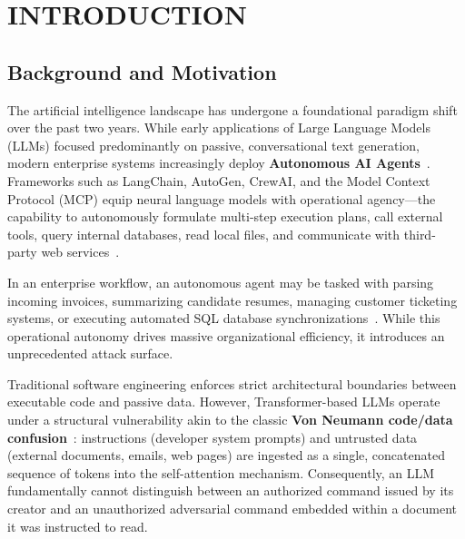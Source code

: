 \chapter{INTRODUCTION}

\section{Background and Motivation}
The artificial intelligence landscape has undergone a foundational paradigm shift over the past two years. While early applications of Large Language Models (LLMs) focused predominantly on passive, conversational text generation, modern enterprise systems increasingly deploy \textbf{Autonomous AI Agents}~\cite{yao2024survey}. Frameworks such as LangChain, AutoGen, CrewAI, and the Model Context Protocol (MCP) equip neural language models with operational agency---the capability to autonomously formulate multi-step execution plans, call external tools, query internal databases, read local files, and communicate with third-party web services~\cite{wang2024survey}.

In an enterprise workflow, an autonomous agent may be tasked with parsing incoming invoices, summarizing candidate resumes, managing customer ticketing systems, or executing automated SQL database synchronizations~\cite{hong2024metagpt}. While this operational autonomy drives massive organizational efficiency, it introduces an unprecedented attack surface.

Traditional software engineering enforces strict architectural boundaries between executable code and passive data. However, Transformer-based LLMs operate under a structural vulnerability akin to the classic \textbf{Von Neumann code/data confusion}~\cite{neumann1993edvac}: instructions (developer system prompts) and untrusted data (external documents, emails, web pages) are ingested as a single, concatenated sequence of tokens into the self-attention mechanism. Consequently, an LLM fundamentally cannot distinguish between an authorized command issued by its creator and an unauthorized adversarial command embedded within a document it was instructed to read.

